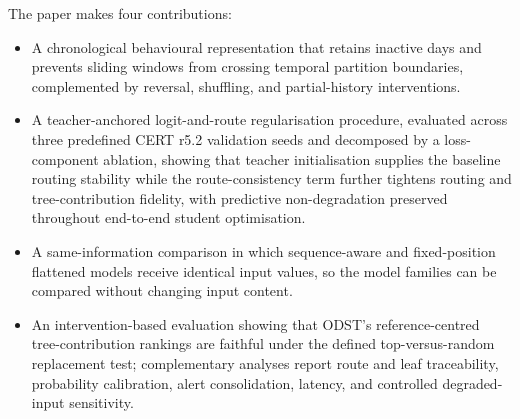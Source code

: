 \smallskip
The paper makes four contributions:
\begin{itemize}
    \item A chronological behavioural representation that retains inactive
    days and prevents sliding windows from crossing temporal partition
    boundaries, complemented by reversal, shuffling, and partial-history
    interventions.
    \item A teacher-anchored logit-and-route regularisation procedure,
    evaluated across three predefined CERT r5.2 validation seeds and
    decomposed by a loss-component ablation, showing that teacher
    initialisation supplies the baseline routing stability while the
    route-consistency term further tightens routing and tree-contribution
    fidelity, with predictive non-degradation preserved throughout
    end-to-end student optimisation.
    \item A same-information comparison in which sequence-aware and
    fixed-position flattened models receive identical input values, so the
    model families can be compared without changing input content.
    \item An intervention-based evaluation showing that ODST's
    reference-centred tree-contribution rankings are faithful under the
    defined top-versus-random replacement test; complementary analyses
    report route and leaf traceability, probability calibration, alert
    consolidation, latency, and controlled degraded-input sensitivity.
\end{itemize}